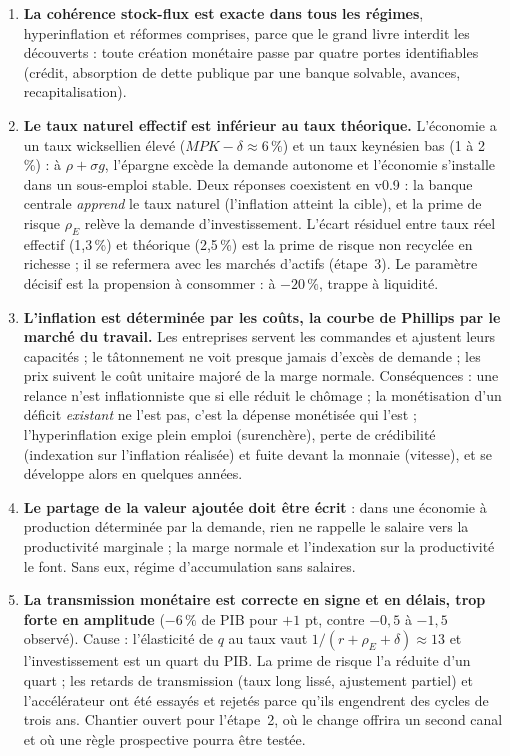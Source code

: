 \documentclass[11pt,a4paper]{article}
\begin{document}
\begin{enumerate}
\item \textbf{La cohérence stock-flux est exacte dans tous les régimes}, hyperinflation et réformes comprises, parce que le grand livre interdit les découverts : toute création monétaire passe par quatre portes identifiables (crédit, absorption de dette publique par une banque solvable, avances, recapitalisation).
\item \textbf{Le taux naturel effectif est inférieur au taux théorique.} L'économie a un taux wicksellien élevé ($MPK-\delta\approx6\,\%$) et un taux keynésien bas (1 à 2\,\%) : à $\rho+\sigma g$, l'épargne excède la demande autonome et l'économie s'installe dans un sous-emploi stable. Deux réponses coexistent en v0.9 : la banque centrale \emph{apprend} le taux naturel (l'inflation atteint la cible), et la prime de risque $\rho_E$ relève la demande d'investissement. L'écart résiduel entre taux réel effectif (1,3\,\%) et théorique (2,5\,\%) est la prime de risque non recyclée en richesse ; il se refermera avec les marchés d'actifs (étape~3). Le paramètre décisif est la propension à consommer : à $-20\,\%$, trappe à liquidité.
\item \textbf{L'inflation est déterminée par les coûts, la courbe de Phillips par le marché du travail.} Les entreprises servent les commandes et ajustent leurs capacités ; le tâtonnement ne voit presque jamais d'excès de demande ; les prix suivent le coût unitaire majoré de la marge normale. Conséquences : une relance n'est inflationniste que si elle réduit le chômage ; la monétisation d'un déficit \emph{existant} ne l'est pas, c'est la dépense monétisée qui l'est ; l'hyperinflation exige plein emploi (surenchère), perte de crédibilité (indexation sur l'inflation réalisée) et fuite devant la monnaie (vitesse), et se développe alors en quelques années.
\item \textbf{Le partage de la valeur ajoutée doit être écrit} : dans une économie à production déterminée par la demande, rien ne rappelle le salaire vers la productivité marginale ; la marge normale et l'indexation sur la productivité le font. Sans eux, régime d'accumulation sans salaires.
\item \textbf{La transmission monétaire est correcte en signe et en délais, trop forte en amplitude} ($-6\,\%$ de PIB pour $+1$ pt, contre $-0{,}5$ à $-1{,}5$ observé). Cause : l'élasticité de $q$ au taux vaut $1/(r+\rho_E+\delta)\approx13$ et l'investissement est un quart du PIB. La prime de risque l'a réduite d'un quart ; les retards de transmission (taux long lissé, ajustement partiel) et l'accélérateur ont été essayés et rejetés parce qu'ils engendrent des cycles de trois ans. Chantier ouvert pour l'étape~2, où le change offrira un second canal et où une règle prospective pourra être testée.

\end{enumerate}
\end{document}
